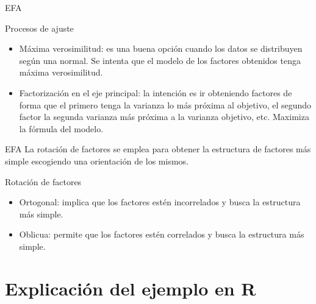 \documentclass[10pt]{beamer}
\begin{document}
\begin{frame}[fragile]{EFA}
\vspace{10px}
\pause
{}
\begin{block}{Procesos de ajuste}
	\begin{itemize}
		\item Máxima verosimilitud: es una buena opción cuando los datos se distribuyen según una normal. Se intenta que el modelo de los factores obtenidos tenga máxima verosimilitud.
		\pause
		\item Factorización en el eje principal: la intención es ir obteniendo factores de forma que el primero tenga la varianza lo más próxima al objetivo, el segundo factor la segunda varianza más próxima a la varianza objetivo, etc. Maximiza la fórmula del modelo.
	\end{itemize}
\end{block}
\end{frame}

\begin{frame}[fragile]{EFA}
	La rotación de factores se emplea para obtener la estructura de factores más simple escogiendo una orientación de los mismos.
	\vspace{10px}
	\pause
	\begin{block}{Rotación de factores}
		\begin{itemize}
			\item Ortogonal: implica que los factores estén incorrelados y busca la estructura más simple.
			\pause
			\item Oblicua: permite que los factores estén correlados y busca la estructura más simple.
		\end{itemize}
	\end{block}
\end{frame}


\section{Explicación del ejemplo en R}
\end{document}
